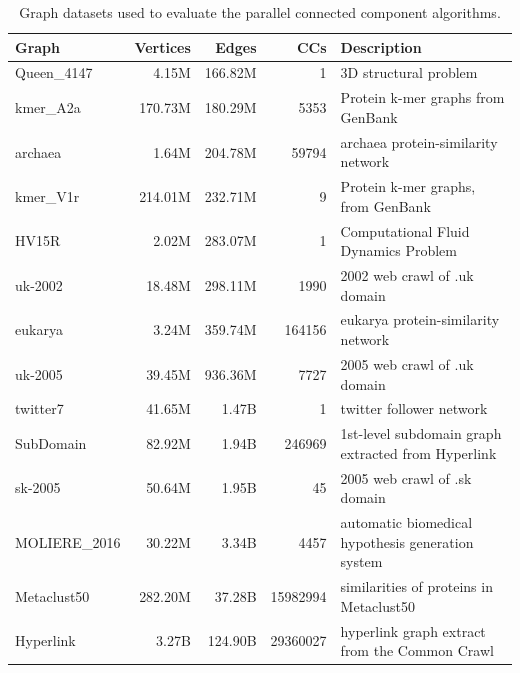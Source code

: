 \documentclass{sokendai_thesis} %
\begin{document}
\begin{table}[t]
\centering
\caption{Graph datasets used to evaluate the parallel connected component algorithms.}
\vspace{-5pt}
\footnotesize
\label{tab:datasets}
\begin{tabular}{lrrrl}
\hline
Graph & Vertices & Edges & CCs & Description \\
\hline
Queen\_4147 & 4.15M & 166.82M & 1 & 3D structural problem~\cite{davis2011university} \\
kmer\_A2a & 170.73M & 180.29M & 5353 & Protein k-mer graphs from GenBank~\cite{davis2011university} \\
archaea & 1.64M & 204.78M & 59794 & archaea protein-similarity network~\cite{hipmcl} \\
kmer\_V1r & 214.01M & 232.71M & 9 & Protein k-mer graphs, from GenBank~\cite{davis2011university} \\
HV15R & 2.02M & 283.07M & 1 & Computational Fluid Dynamics Problem~\cite{davis2011university} \\
uk-2002 & 18.48M & 298.11M & 1990 & 2002 web crawl of .uk domain~\cite{davis2011university} \\
eukarya & 3.24M & 359.74M & 164156 & eukarya protein-similarity network~\cite{hipmcl} \\
uk-2005 & 39.45M & 936.36M & 7727 & 2005 web crawl of .uk domain~\cite{davis2011university} \\
twitter7 & 41.65M & 1.47B & 1 & twitter follower network~\cite{davis2011university} \\
SubDomain & 82.92M & 1.94B & 246969 & 1st-level subdomain graph extracted from Hyperlink~\cite{meusel2014graph} \\
sk-2005 & 50.64M & 1.95B & 45 & 2005 web crawl of .sk domain~\cite{davis2011university} \\
MOLIERE\_2016 & 30.22M & 3.34B & 4457 & automatic biomedical hypothesis generation system~\cite{davis2011university} \\
Metaclust50 & 282.20M & 37.28B & 15982994 & similarities of proteins in Metaclust50~\cite{hipmcl} \\
Hyperlink & 3.27B & 124.90B & 29360027 & hyperlink graph extract from the Common Crawl~\cite{meusel2014graph}\\
\hline
\end{tabular}
\end{table}
\end{document}

